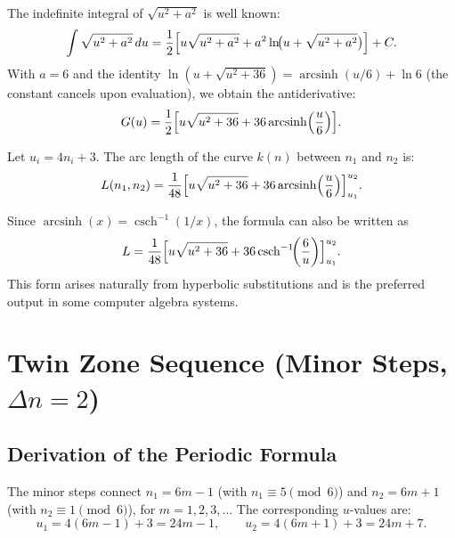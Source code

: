 The indefinite integral of $\sqrt{u^2 + a^2}$ is well known:
\[
  \int \sqrt{u^2 + a^2}\,du
  = \frac{1}{2}\Bigl[u\sqrt{u^2 + a^2}
    + a^2\ln\!\bigl(u + \sqrt{u^2+a^2}\bigr)\Bigr] + C.
\]
With $a = 6$ and the identity
$\ln(u + \sqrt{u^2+36}) = \operatorname{arcsinh}(u/6) + \ln 6$ (the constant
cancels upon evaluation), we obtain the antiderivative:
\[
  G(u) = \frac{1}{2}\Bigl[u\sqrt{u^2+36}
         + 36\operatorname{arcsinh}\!\left(\frac{u}{6}\right)\Bigr].
\]

\begin{satz}\label{satz:bl_geschlossen}
Let $u_i = 4n_i + 3$. The arc length of the curve $k(n)$ between $n_1$
and $n_2$ is:
\begin{equation}\label{eq:bl_geschlossen}
  L(n_1, n_2)
  = \frac{1}{48}\Bigl[u\sqrt{u^2+36}
    + 36\operatorname{arcsinh}\!\left(\frac{u}{6}\right)
    \Bigr]_{u_1}^{u_2}.
\end{equation}
\end{satz}

\begin{bemerkung}
Since $\operatorname{arcsinh}(x) = \operatorname{csch}^{-1}(1/x)$, the
formula can also be written as
\[
  L = \frac{1}{48}\Bigl[u\sqrt{u^2+36}
    + 36\operatorname{csch}^{-1}\!\!\left(\frac{6}{u}\right)
    \Bigr]_{u_1}^{u_2}.
\]
This form arises naturally from hyperbolic substitutions and is
the preferred output in some computer algebra systems.
\end{bemerkung}

\section{Twin Zone Sequence (Minor Steps, \texorpdfstring{$\Delta n = 2$}{Δn = 2})}
\label{sec:twin_zone_bl}

\subsection{Derivation of the Periodic Formula}

The minor steps connect $n_1 = 6m-1$ (with $n_1 \equiv 5 \pmod{6}$)
and $n_2 = 6m+1$ (with $n_2 \equiv 1 \pmod{6}$), for $m = 1, 2, 3, \ldots$
The corresponding $u$-values are:
\[
  u_1 = 4(6m-1)+3 = 24m - 1,
  \qquad
  u_2 = 4(6m+1)+3 = 24m + 7.
\]

